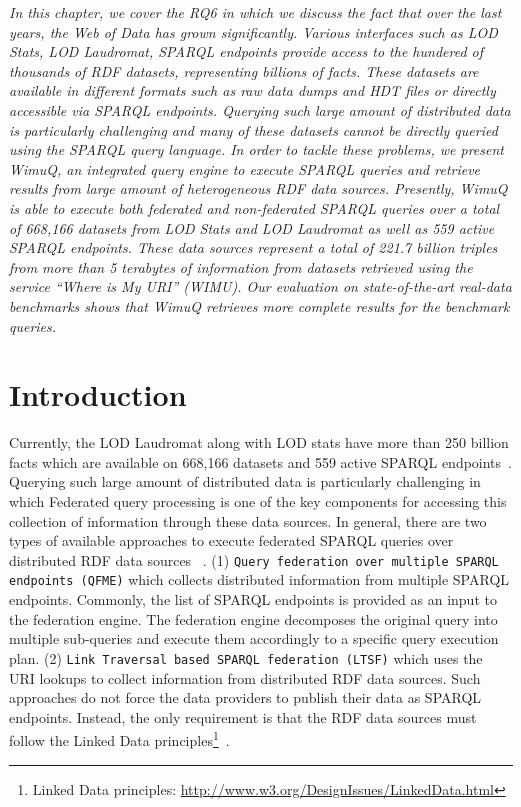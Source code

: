\textit{In this chapter, we cover the RQ6 in which we discuss the fact that over the last years, the Web of Data has grown significantly. Various interfaces such as LOD Stats, LOD Laudromat, SPARQL endpoints provide access to the hundered of thousands of RDF datasets, representing billions of facts. These datasets are available in different formats such as raw data dumps and HDT files or directly accessible via SPARQL endpoints. Querying such large amount of distributed data is particularly challenging and many of these datasets cannot be directly queried using the SPARQL query language. In order to tackle these problems, we present WimuQ, an integrated query engine to execute SPARQL queries and retrieve results from large amount of heterogeneous RDF data sources. Presently, WimuQ is able to execute both federated and non-federated SPARQL queries over a total of 668,166 datasets from LOD Stats and LOD Laudromat as well as 559 active SPARQL endpoints. These data sources represent a total of 221.7 billion triples from more than 5 terabytes of information from datasets retrieved using the service ``Where is My URI'' (WIMU). Our evaluation on state-of-the-art real-data benchmarks shows that WimuQ retrieves more complete results for the benchmark queries. }	

\section{Introduction}
\label{sec:intro}

Currently, the LOD Laudromat along with LOD stats have more than 250 billion facts which are available on 668,166 datasets and 559 active SPARQL endpoints~\cite{valdestilhas2018my}. Querying such large amount of distributed data is particularly challenging in which Federated query processing is one of the key components for accessing this collection of information through these data sources. In general, there are two types of available approaches to execute federated SPARQL queries over distributed RDF data sources~ \cite{saleem2015fine}. (1) \texttt{Query federation over multiple SPARQL endpoints (QFME)} which collects distributed information from multiple SPARQL endpoints. Commonly, the list of SPARQL endpoints is provided as an input to the federation engine. The federation engine decomposes the original query into multiple sub-queries and execute them accordingly to a specific query execution plan. (2) \texttt{Link Traversal based SPARQL federation (LTSF)} which uses the URI lookups to collect information from distributed RDF data sources. Such approaches do not force the data providers to publish their data as SPARQL endpoints. Instead, the only requirement is that the RDF data sources must follow the Linked Data principles\footnote{Linked Data principles: \url{http://www.w3.org/DesignIssues/LinkedData.html}}~\cite{hartig2013overview}. 

